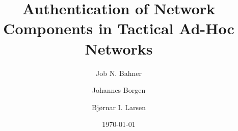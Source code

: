 \documentclass[british,titlepage]{ntnuthesis}
\title{Authentication of Network Components in Tactical Ad-Hoc Networks}
\author{Job N. Bahner \and Johannes Borgen \and Bjørnar I. Larsen}
\date{\today}
\begin{document}



\tableofcontents
\listoffigures
\listoftables
\lstlistoflistings








\printbibliography



\appendix

\end{document}
